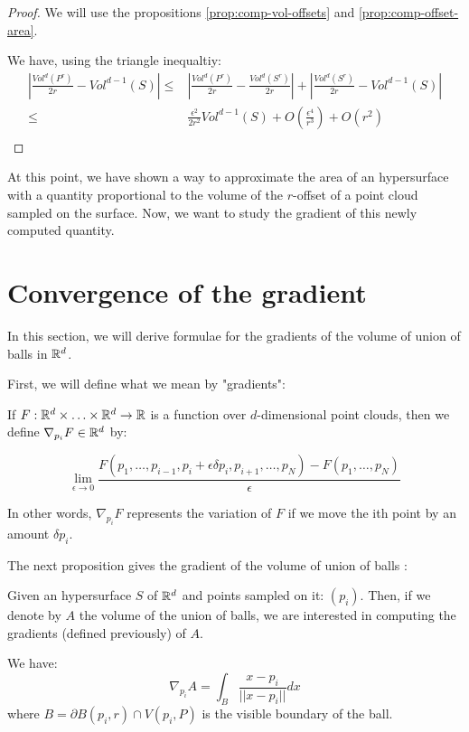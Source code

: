\begin{proof}
    We will use the propositions \ref{prop:comp-vol-offsets} and
    \ref{prop:comp-offset-area}.

    We have, using the triangle inequaltiy:
    \begin{align*}
        \left| \frac{Vol^d(P^r)}{2r} - Vol^{d-1}(S) \right| \leq& \left| \frac{Vol^d(P^r)}{2r} -
            \frac{Vol^d(S^r)}{2r} \right| + \left| \frac{Vol^d(S^r)}{2r} -
            Vol^{d-1}(S) \right| \\
        \leq& \frac{\epsilon^2}{2r^2} Vol^{d-1}(S) + O(\frac{\epsilon^4}{r^3}) + O(r^2) \\
    \end{align*}
\end{proof}

At this point, we have shown a way to approximate the area of an hypersurface
with a quantity proportional to the volume of the $r$-offset of a point cloud
sampled on the surface.
Now, we want to study the gradient of this newly computed quantity.

\section{Convergence of the gradient}

In this section, we will derive formulae for the gradients of the volume of
union of balls in $ \mathbb{R}^d $.

First, we will define what we mean by "gradients":

\begin{definition}
    If $ F : \mathbb{R}^d \times \ldots \times \mathbb{R}^d \to \mathbb{R} $ is a function over
    $d$-dimensional point clouds, then we define $ \nabla_{p_i} F \in \mathbb{R}^d $ by:

    $$ \lim\limits_{\epsilon \to 0} \frac{F(p_1, \ldots, p_{i-1}, p_i + \epsilon
        \delta p_i, p_{i+1}, \ldots, p_N) - F(p_1, \ldots, p_N)}{\epsilon} $$

    In other words, $ \nabla_{p_i} F $ represents the variation of $ F $ if
    we move the ith point by an amount $ \delta p_i $.
\end{definition}

The next proposition gives the gradient of the volume of union of balls :
\begin{proposition}
    Given an hypersurface $ S $ of $ \mathbb{R}^d $ and points sampled on it: $ (p_i) $.
    Then, if we denote by $ A $ the volume of the union of balls, we are
    interested in computing the gradients (defined previously) of $ A $.

    We have:
    \begin{equation}
        \label{eqn:gradient_area_2d}
        \nabla_{p_i} A = \int_{B} \frac{x - p_i}{||x - p_i||} dx
    \end{equation}
    where $ B = \partial B(p_i, r) \cap V(p_i, P) $ is the visible boundary of
    the ball.
\end{proposition}

